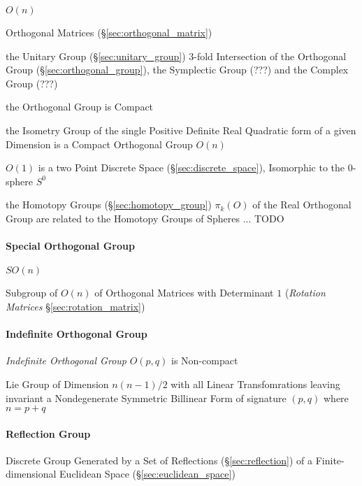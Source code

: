$O(n)$

Orthogonal Matrices (\S\ref{sec:orthogonal_matrix})

the Unitary Group (\S\ref{sec:unitary_group}) 3-fold Intersection of the
Orthogonal Group (\S\ref{sec:orthogonal_group}), the Symplectic Group (???) and
the Complex Group (???) %

the Orthogonal Group is Compact

the Isometry Group of the single Positive Definite Real Quadratic form of a
given Dimension is a Compact Orthogonal Group $O(n)$

$O(1)$ is a two Point Discrete Space (\S\ref{sec:discrete_space}), Isomorphic
to the $0$-sphere $S^0$

the Homotopy Groups (\S\ref{sec:homotopy_group}) $\pi_k(O)$ of the Real
Orthogonal Group are related to the Homotopy Groups of Spheres
... TODO



\paragraph{Special Orthogonal Group}\label{sec:special_orthogonal_group}\hfill

$SO(n)$

Subgroup of $O(n)$ of Orthogonal Matrices with Determinant $1$ (\emph{Rotation
  Matrices} \S\ref{sec:rotation_matrix})



\paragraph{Indefinite Orthogonal Group}
\label{sec:indefinite_orthogonal_group}\hfill

\emph{Indefinite Orthogonal Group} $O(p,q)$ is Non-compact

Lie Group of Dimension $n(n-1)/2$ with all Linear Transfomrations leaving
invariant a Nondegenerate Symmetric Billinear Form of signature $(p,q)$ where
$n = p+q$



\paragraph{Reflection Group}\label{sec:reflection_group}\hfill

Discrete Group Generated by a Set of Reflections (\S\ref{sec:reflection}) of a
Finite-dimensional Euclidean Space (\S\ref{sec:euclidean_space})



